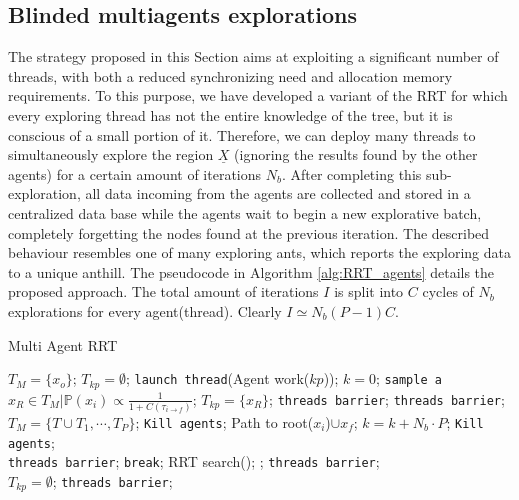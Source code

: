 \subsection{Blinded multiagents explorations}
\label{subsec:MT_04}

The strategy proposed in this Section aims at exploiting a significant number of threads, with both a  reduced synchronizing need and allocation memory requirements.
To this purpose, we have developed a variant of the RRT for which every exploring thread has not the entire knowledge of the tree, but it is conscious of a small portion of it. Therefore, we can deploy many threads to simultaneously explore the region $\underline{X}$ (ignoring the results found by the other agents) for a certain amount of iterations $N_b$. After completing this sub-exploration, all data incoming from the agents are collected and stored in a centralized data base while the agents wait to begin a new explorative batch, completely forgetting the nodes found at the previous iteration. 
The described behaviour resembles one of many exploring ants, which reports the exploring data to a unique anthill.  The pseudocode in Algorithm \ref{alg:RRT_agents} details the proposed approach. The total amount of iterations $I$ is split into $C$ cycles of $N_b$ explorations for every agent(thread). 
Clearly $I \simeq N_b (P-1) C$.

\begin{algorithm}
\caption{Multi Agent RRT}\label{alg:RRT_agents}
\begin{algorithmic}[1]
\State $T_M=\lbrace x_o \rbrace$; 
\State $T_{kp} = \emptyset$;
\State \texttt{launch thread}(Agent work($kp$));
\EndFor
\State $k=0$;
	\State \texttt{sample a} $x_R \in T_M \vert \mathbb{P}(x_i) \propto \frac{1}{1+C(\tau_{i \rightarrow f})}$;
	\State $T_{kp} = \lbrace x_{R} \rbrace$;
	\EndFor
	\State \texttt{threads barrier};
	\State \texttt{threads barrier};
	\State $T_M = \lbrace T \cup T_1, \cdots, T_P \rbrace$;
		\State \texttt{Kill agents};
		\State \Return Path to root($x_i$)$ \cup x_f$;	
	\EndIf
	\State $k=k+N_b \cdot P$;
\EndWhile
	\State \texttt{Kill agents};
\EndProcedure
\\
	\State \texttt{threads barrier};
	\State \texttt{break};
	\EndIf
\State RRT search(); ;
	\State \texttt{threads barrier};
\EndWhile
\EndProcedure
\\
	\State $T_{kp} = \emptyset$;
	\EndFor
	\State \texttt{threads barrier};
\EndProcedure
\end{algorithmic}
\end{algorithm}

